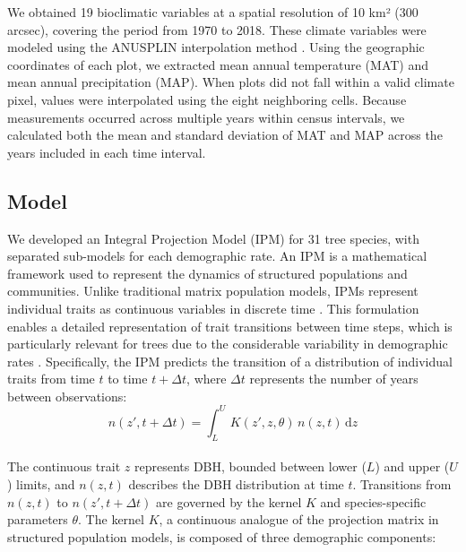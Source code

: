 We obtained 19 bioclimatic variables at a spatial resolution of 10 km²
(300 arcsec), covering the period from 1970 to 2018. These climate
variables were modeled using the ANUSPLIN interpolation method
\citep{McKenney2011}. Using the geographic coordinates of each plot, we
extracted mean annual temperature (MAT) and mean annual precipitation
(MAP). When plots did not fall within a valid climate pixel, values were
interpolated using the eight neighboring cells. Because measurements
occurred across multiple years within census intervals, we calculated
both the mean and standard deviation of MAT and MAP across the years
included in each time interval.\\

\hypertarget{model}{%
\subsection{Model}\label{model}}

We developed an Integral Projection Model (IPM) for 31 tree species,
with separated sub-models for each demographic rate. An IPM is a
mathematical framework used to represent the dynamics of structured
populations and communities. Unlike traditional matrix population
models, IPMs represent individual traits as continuous variables in
discrete time \citep{Easterling2000}. This formulation enables a
detailed representation of trait transitions between time steps, which
is particularly relevant for trees due to the considerable variability
in demographic rates \citep{kohyama1992, Clark2011, LeSquin2021}.
Specifically, the IPM predicts the transition of a distribution of
individual traits from time \(t\) to time \(t + \Delta t\), where
\(\Delta t\) represents the number of years between observations:\\

\begin{equation}
n(z', t + \Delta t) = \int_{L}^{U} \, K(z', z, \theta)\, n(z, t)\, \mathrm{d}z
\label{eq:ipm}\end{equation}\\

The continuous trait \(z\) represents DBH, bounded between lower (\(L\))
and upper (\(U\)) limits, and \(n(z, t)\) describes the DBH distribution
at time \(t\). Transitions from \(n(z, t)\) to \(n(z', t + \Delta t)\)
are governed by the kernel \(K\) and species-specific parameters
\(\theta\). The kernel \(K\), a continuous analogue of the projection
matrix in structured population models, is composed of three demographic
components:\\

